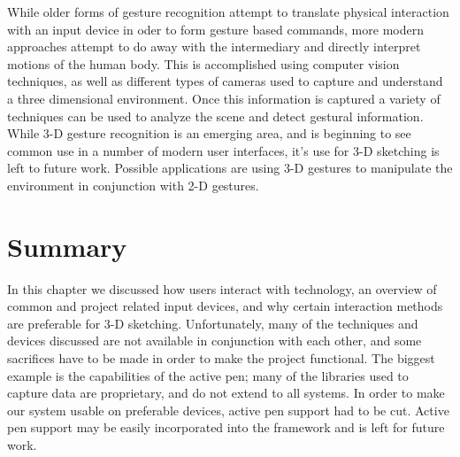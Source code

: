 \documentclass[11pt]{report}
\begin{document}
While older forms of gesture recognition attempt to translate physical interaction with an input device in oder to form gesture based commands, more modern approaches attempt to do away with the intermediary and directly interpret motions of the human body.
This is accomplished using computer vision techniques, as well as different types of cameras used to capture and understand a three dimensional environment.
Once this information is captured a variety of techniques can be used to analyze the scene and detect gestural information. 
While 3-D gesture recognition is an emerging area, and is beginning to see common use in a number of modern user interfaces, it's use for 3-D sketching is left to future work.
Possible applications are using 3-D gestures to manipulate the environment in conjunction with 2-D gestures.

\section{Summary}
In this chapter we discussed how users interact with technology, an overview of common and project related input devices, and why certain interaction methods are preferable for 3-D sketching.
Unfortunately, many of the techniques and devices discussed are not available in conjunction with each other, and some sacrifices have to be made in order to make the project functional.
The biggest example is the capabilities of the active pen; many of the libraries used to capture data are proprietary, and do not extend to all systems.
In order to make our system usable on preferable devices, active pen support had to be cut.
Active pen support may be easily incorporated into the framework and is left for future work.
\end{document}
